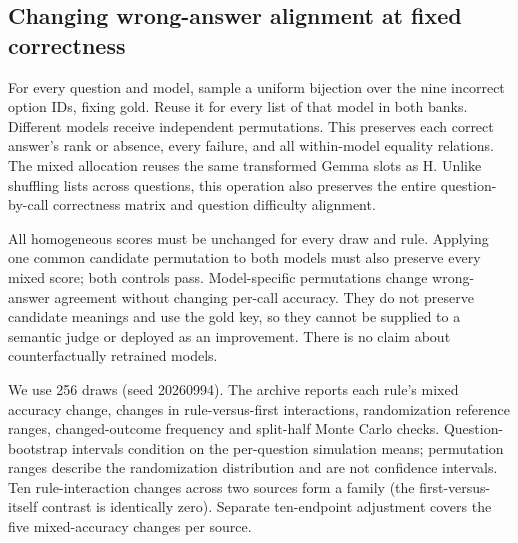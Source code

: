 \subsection{Changing wrong-answer alignment at fixed correctness}
For every question and model, sample a uniform bijection over the nine incorrect option IDs, fixing gold. Reuse it for every list of that model in both banks. Different models receive independent permutations. This preserves each correct answer's rank or absence, every failure, and all within-model equality relations. The mixed allocation reuses the same transformed Gemma slots as H. Unlike shuffling lists across questions, this operation also preserves the entire question-by-call correctness matrix and question difficulty alignment.

All homogeneous scores must be unchanged for every draw and rule. Applying one common candidate permutation to both models must also preserve every mixed score; both controls pass. Model-specific permutations change wrong-answer agreement without changing per-call accuracy. They do not preserve candidate meanings and use the gold key, so they cannot be supplied to a semantic judge or deployed as an improvement. There is no claim about counterfactually retrained models.

We use 256 draws (seed 20260994). The archive reports each rule's mixed accuracy change, changes in rule-versus-first interactions, randomization reference ranges, changed-outcome frequency and split-half Monte Carlo checks. Question-bootstrap intervals condition on the per-question simulation means; permutation ranges describe the randomization distribution and are not confidence intervals. Ten rule-interaction changes across two sources form a family (the first-versus-itself contrast is identically zero). Separate ten-endpoint adjustment covers the five mixed-accuracy changes per source.

